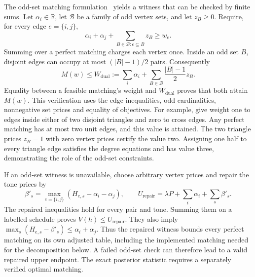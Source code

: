 \documentclass[10pt,letterpaper]{article}
\begin{document}
The odd-set matching formulation~\cite{edmonds} yields a witness that can be checked by finite sums. Let $\alpha_i\in\mathbb R$, let $\mathcal B$ be a family of odd vertex sets, and let $z_B\ge0$. Require, for every edge $e=\{i,j\}$,
\begin{equation}
 \alpha_i+\alpha_j+\sum_{B\in\mathcal B:e\subseteq B}z_B\ge w_e.
 \label{supp:odd-inequality}
\end{equation}
Summing over a perfect matching charges each vertex once. Inside an odd set $B$, disjoint edges can occupy at most $(|B|-1)/2$ pairs. Consequently
\begin{equation}
 M(w)\le W_{\mathrm{dual}}
 :=\sum_i\alpha_i+\sum_{B\in\mathcal B}\frac{|B|-1}{2}z_B.
 \label{supp:odd-objective}
\end{equation}
Equality between a feasible matching's weight and $W_{\mathrm{dual}}$ proves that both attain $M(w)$. This verification uses the edge inequalities, odd cardinalities, nonnegative set prices and equality of objectives. For example, give weight one to edges inside either of two disjoint triangles and zero to cross edges. Any perfect matching has at most two unit edges, and this value is attained. The two triangle prices $z_B=1$ with zero vertex prices certify the value two. Assigning one half to every triangle edge satisfies the degree equations and has value three, demonstrating the role of the odd-set constraints.

If an odd-set witness is unavailable, choose arbitrary vertex prices and repair the tone prices by
\begin{equation}
 \beta'_s=\max_{e=\{i,j\}}(H_{e,s}-\alpha_i-\alpha_j),\qquad
 U_{\mathrm{repair}}=\lambda P+\sum_i\alpha_i+\sum_s\beta'_s.
 \label{supp:p3}
\end{equation}
The repaired inequalities hold for every pair and tone. Summing them on a labelled schedule proves $V(h)\le U_{\mathrm{repair}}$. They also imply $\max_s(H_{e,s}-\beta'_s)\le\alpha_i+\alpha_j$. Thus the repaired witness bounds every perfect matching on its own adjusted table, including the implemented matching needed for the decomposition below. A failed odd-set check can therefore lead to a valid repaired upper endpoint. The exact posterior statistic requires a separately verified optimal matching.
\end{document}
